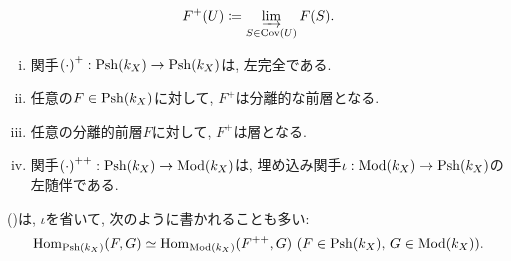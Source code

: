 \documentclass[../main]{subfiles}
\begin{document}
\begin{dfn}[層化(sheafification)]
  \[
    F^+(U) \coloneqq
    \ilim[S\in\Cov(U)] F(S).
  \]
\end{dfn}

\begin{thm}
  \begin{enumerate}[(i)]
    \item 関手${(\cdot)}^+ : \Psh(k_X)\to\Psh(k_X)$は, 左完全である.
    \item 任意の$F\in\Psh(k_X)$に対して, $F^+$は分離的な前層となる.
    \item 任意の分離的前層$F$に対して, $F^+$は層となる.
    \item 関手${(\cdot)}^{++} : \Psh(k_X)\to\Mod(k_X)$は,
      埋め込み関手$\iota : \Mod(k_X)\to\Psh(k_X)$の左随伴である.
  \end{enumerate}
\end{thm}
()は, $\iota$を省いて, 次のように書かれることも多い:
\[
  \Hom_{\Psh(k_X)}(F,G)
  \simeq
  \Hom_{\Mod(k_X)}(F^{++},G)
  \,\,(F\in\Psh(k_X),\,G\in\Mod(k_X)).
\]
\end{document}
